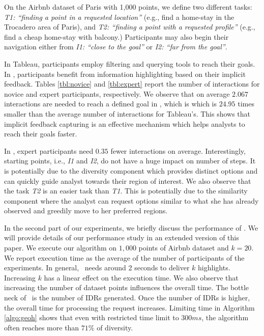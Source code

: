 \vspace{2pt}
On the Airbnb dataset of Paris with 1,000 points, we define two different tasks: {\em T1: ``finding a point in a requested location''} (e.g., find a home-stay in the Trocadero area of Paris), and {\em T2: ``finding a point with a requested profile''} (e.g., find a cheap home-stay with balcony.) Participants may also begin their navigation either from {\em I1: ``close to the goal''} or {\em I2: ``far from the goal''}. 

\vspace{2pt}
In {\sc Tableau}, participants employ filtering and querying tools to reach their goals. In \sgg, participants benefit from information highlighting based on their implicit feedback. Tables \ref{tbl:novice} and \ref{tbl:expert} report the number of interactions for novice and expert participants, respectively. We observe that on average $2.067$ interactions are needed to reach a defined goal in \sgg, which is  which is $24.95$ times smaller than the average number of interactions for {\sc Tableau}'s. This shows that implicit feedback capturing is an effective mechanism which helps analysts to reach their goals faster.

\vspace{2pt}
In \sgg, expert participants need $0.35$ fewer interactions on average. Interestingly, starting points, i.e., {\em I1} and {\em I2}, do not have a huge impact on number of steps. It is potentially due to the diversity component which provides distinct options and can quickly guide analyst towards their region of interest. We also observe that the task {\em T2} is an easier task than {\em T1}. This is potentially due to the similarity component where the analyst can request options similar to what she has already observed and greedily move to her preferred regions.

\vspace{2pt}
In the second part of our experiments, we briefly discuss the performance of \sgg. We will provide details of our performance study in an extended version of this paper. We execute our algorithm on $1,000$ points of Airbnb dataset and $k=20$. We report execution time as the average of the number of participants of the experiments. In general, \sgg\ needs around 2 seconds to deliver $k$ highlights. Increasing $k$ has a linear effect on the execution time. We also observe that increasing the number of dataset points influences the overall time. The bottle neck of \sgg\ is the number of IDRs generated. Once the number of IDRs is higher, the overall time for processing the request increases. Limiting time in Algorithm \ref{algo:geoh} shows that even with restricted time limit to $300ms$, the algorithm often reaches more than $71\%$ of diversity.



